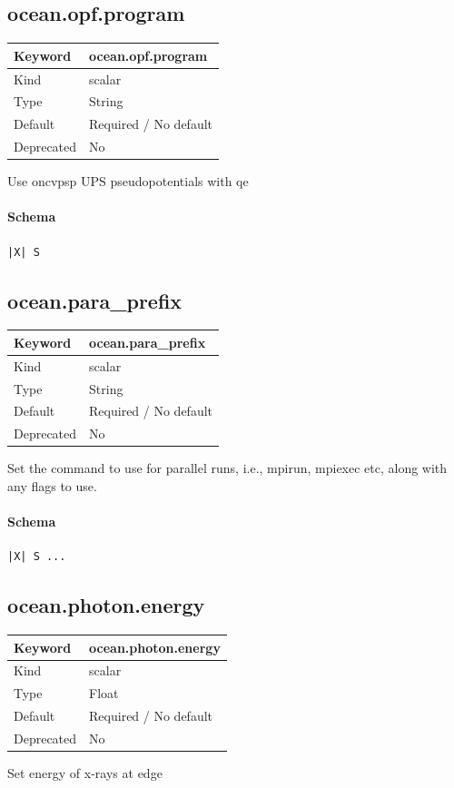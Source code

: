 \documentclass[11pt]{article}
\begin{document}
{{{{{\subsection{ocean.opf.program}
\label{kw:ocean-opf-program}
\begin{longtable}{|p{1.5in}|p{4.5in}|}
\hline
Keyword & ocean.opf.program \\
\hline
Kind & scalar \\
\hline
Type & String \\
\hline
Default & Required / No default \\
\hline
Deprecated & No \\
\hline
\end{longtable}
 Use oncvpsp UPS pseudopotentials with qe

\paragraph{Schema}
\begin{Verbatim}
|X| S
\end{Verbatim}

\subsection{ocean.para\_prefix}
\label{kw:ocean-para-prefix}
\begin{longtable}{|p{1.5in}|p{4.5in}|}
\hline
Keyword & ocean.para\_prefix \\
\hline
Kind & scalar \\
\hline
Type & String \\
\hline
Default & Required / No default \\
\hline
Deprecated & No \\
\hline
\end{longtable}
 Set the command to use for parallel runs, i.e., mpirun, mpiexec etc,
 along with any flags to use.

\paragraph{Schema}
\begin{Verbatim}
|X| S ...
\end{Verbatim}

\subsection{ocean.photon.energy}
\label{kw:ocean-photon-energy}
\begin{longtable}{|p{1.5in}|p{4.5in}|}
\hline
Keyword & ocean.photon.energy \\
\hline
Kind & scalar \\
\hline
Type & Float \\
\hline
Default & Required / No default \\
\hline
Deprecated & No \\
\hline
\end{longtable}
 Set energy of x-rays at edge

}}}}}
\end{document}
